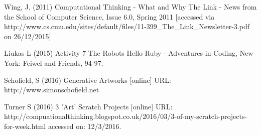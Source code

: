 \documentclass[krantz1,ChapterTOCs, book]{krantz}
\begin{document}
Wing, J. (2011) Computational Thinking - What and Why The Link - News from the School of Computer Science, Issue 6.0, Spring 2011 [accessed via http://www.cs.cmu.edu/sites/default/files/11-399_The_Link_Newsletter-3.pdf on 26/12/2015]
 
Liukas L (2015) Activity 7 The Robots Hello Ruby - Adventures in Coding, New York: Feiwel and Friends, 94-97.
 
Schofield, S (2016) Generative Artworks [online] URL: http://www.simonschofield.net
 
Turner S (2016) 3 'Art' Scratch Projects [online] URL: http://compuationalthinking.blogspot.co.uk/2016/03/3-of-my-scratch-projects-for-week.html accessed on: 12/3/2016.

\printindex
\end{document}
